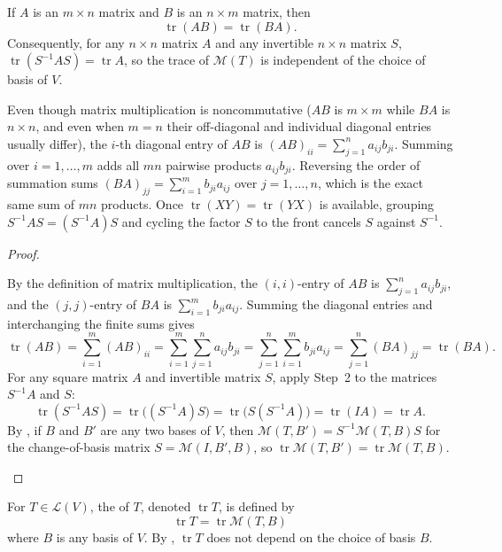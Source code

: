 \documentclass[10pt]{scrartcl}
\DeclareMathOperator{\tr}{tr}\DeclareMathOperator{\nul}{null}\DeclareMathOperator{\range}{range}\DeclareMathOperator{\spn}{span}
\newcommand{\LL}{\mathcal L}\newcommand{\PP}{\mathcal P}\newcommand{\MM}{\mathcal M}
\begin{document}
\begin{proposition*}
  If $A$ is an $m\times n$ matrix and $B$ is an $n\times m$ matrix, then
  \[
    \tr(AB) = \tr(BA).
  \]
  Consequently, for any $n\times n$ matrix $A$ and any invertible $n\times n$ matrix $S$, $\tr(S^{-1}AS)=\tr A$, so the trace of $\MM(T)$ is independent of the choice of basis of $V$.
\end{proposition*}
\begin{ideabox}
  Even though matrix multiplication is noncommutative ($AB$ is $m\times m$ while $BA$ is $n\times n$, and even when $m=n$ their off-diagonal and individual diagonal entries usually differ), the $i$-th diagonal entry of $AB$ is $(AB)_{ii}=\sum_{j=1}^n a_{ij}b_{ji}$. Summing over $i=1,\dots,m$ adds all $mn$ pairwise products $a_{ij}b_{ji}$. Reversing the order of summation sums $(BA)_{jj}=\sum_{i=1}^m b_{ji}a_{ij}$ over $j=1,\dots,n$, which is the exact same sum of $mn$ products. Once $\tr(XY)=\tr(YX)$ is available, grouping $S^{-1}AS=(S^{-1}A)S$ and cycling the factor $S$ to the front cancels $S$ against $S^{-1}$.
\end{ideabox}
\begin{proof}
  \begin{steps}
    \ii By the definition of matrix multiplication, the $(i,i)$-entry of $AB$ is $\sum_{j=1}^n a_{ij}b_{ji}$, and the $(j,j)$-entry of $BA$ is $\sum_{i=1}^m b_{ji}a_{ij}$.
    \ii Summing the diagonal entries and interchanging the finite sums gives
    \[
      \tr(AB) = \sum_{i=1}^m (AB)_{ii} = \sum_{i=1}^m\sum_{j=1}^n a_{ij}b_{ji} = \sum_{j=1}^n\sum_{i=1}^m b_{ji}a_{ij} = \sum_{j=1}^n (BA)_{jj} = \tr(BA).
    \]
    \ii For any square matrix $A$ and invertible matrix $S$, apply Step~2 to the matrices $S^{-1}A$ and $S$:
    \[
      \tr(S^{-1}AS) = \tr\big((S^{-1}A)S\big) = \tr\big(S(S^{-1}A)\big) = \tr(IA) = \tr A.
    \]
    \ii By , if $B$ and $B'$ are any two bases of $V$, then $\MM(T,B')=S^{-1}\MM(T,B)S$ for the change-of-basis matrix $S=\MM(I,B',B)$, so $\tr\MM(T,B')=\tr\MM(T,B)$.
  \end{steps}
\end{proof}

\begin{definition*}
  For $T\in\LL(V)$, the  of $T$, denoted $\tr T$, is defined by
  \[
    \tr T = \tr\MM(T,B)
  \]
  where $B$ is any basis of $V$. By , $\tr T$ does not depend on the choice of basis $B$.
\end{definition*}
\end{document}
